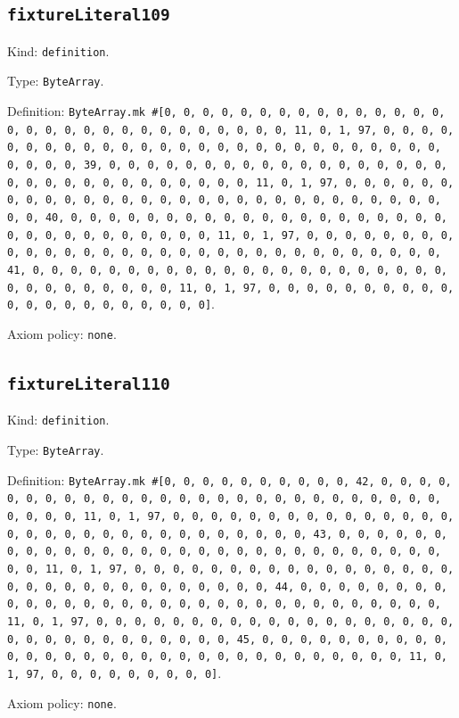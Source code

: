 \documentclass[11pt]{article}
\begin{document}
\subsection*{\texttt{fixtureLiteral109}}
\noindent Kind: \texttt{definition}.\par
\noindent Type: \texttt{ByteArray}.\par
\noindent Definition: \texttt{ByteArray.mk \#[0, 0, 0, 0, 0, 0, 0, 0, 0, 0, 0, 0, 0, 0, 0, 0, 0, 0, 0, 0, 0, 0, 0, 0, 0, 0, 0, 0, 0, 0, 11, 0, 1, 97, 0, 0, 0, 0, 0, 0, 0, 0, 0, 0, 0, 0, 0, 0, 0, 0, 0, 0, 0, 0, 0, 0, 0, 0, 0, 0, 0, 0, 0, 0, 0, 39, 0, 0, 0, 0, 0, 0, 0, 0, 0, 0, 0, 0, 0, 0, 0, 0, 0, 0, 0, 0, 0, 0, 0, 0, 0, 0, 0, 0, 0, 0, 0, 11, 0, 1, 97, 0, 0, 0, 0, 0, 0, 0, 0, 0, 0, 0, 0, 0, 0, 0, 0, 0, 0, 0, 0, 0, 0, 0, 0, 0, 0, 0, 0, 0, 0, 0, 40, 0, 0, 0, 0, 0, 0, 0, 0, 0, 0, 0, 0, 0, 0, 0, 0, 0, 0, 0, 0, 0, 0, 0, 0, 0, 0, 0, 0, 0, 0, 0, 11, 0, 1, 97, 0, 0, 0, 0, 0, 0, 0, 0, 0, 0, 0, 0, 0, 0, 0, 0, 0, 0, 0, 0, 0, 0, 0, 0, 0, 0, 0, 0, 0, 0, 0, 41, 0, 0, 0, 0, 0, 0, 0, 0, 0, 0, 0, 0, 0, 0, 0, 0, 0, 0, 0, 0, 0, 0, 0, 0, 0, 0, 0, 0, 0, 0, 0, 11, 0, 1, 97, 0, 0, 0, 0, 0, 0, 0, 0, 0, 0, 0, 0, 0, 0, 0, 0, 0, 0, 0, 0, 0]}.\par
\noindent Axiom policy: \texttt{none}.\par
\subsection*{\texttt{fixtureLiteral110}}
\noindent Kind: \texttt{definition}.\par
\noindent Type: \texttt{ByteArray}.\par
\noindent Definition: \texttt{ByteArray.mk \#[0, 0, 0, 0, 0, 0, 0, 0, 0, 0, 42, 0, 0, 0, 0, 0, 0, 0, 0, 0, 0, 0, 0, 0, 0, 0, 0, 0, 0, 0, 0, 0, 0, 0, 0, 0, 0, 0, 0, 0, 0, 0, 11, 0, 1, 97, 0, 0, 0, 0, 0, 0, 0, 0, 0, 0, 0, 0, 0, 0, 0, 0, 0, 0, 0, 0, 0, 0, 0, 0, 0, 0, 0, 0, 0, 0, 0, 43, 0, 0, 0, 0, 0, 0, 0, 0, 0, 0, 0, 0, 0, 0, 0, 0, 0, 0, 0, 0, 0, 0, 0, 0, 0, 0, 0, 0, 0, 0, 0, 11, 0, 1, 97, 0, 0, 0, 0, 0, 0, 0, 0, 0, 0, 0, 0, 0, 0, 0, 0, 0, 0, 0, 0, 0, 0, 0, 0, 0, 0, 0, 0, 0, 0, 0, 44, 0, 0, 0, 0, 0, 0, 0, 0, 0, 0, 0, 0, 0, 0, 0, 0, 0, 0, 0, 0, 0, 0, 0, 0, 0, 0, 0, 0, 0, 0, 0, 11, 0, 1, 97, 0, 0, 0, 0, 0, 0, 0, 0, 0, 0, 0, 0, 0, 0, 0, 0, 0, 0, 0, 0, 0, 0, 0, 0, 0, 0, 0, 0, 0, 0, 0, 45, 0, 0, 0, 0, 0, 0, 0, 0, 0, 0, 0, 0, 0, 0, 0, 0, 0, 0, 0, 0, 0, 0, 0, 0, 0, 0, 0, 0, 0, 0, 0, 11, 0, 1, 97, 0, 0, 0, 0, 0, 0, 0, 0, 0]}.\par
\noindent Axiom policy: \texttt{none}.\par
\end{document}
